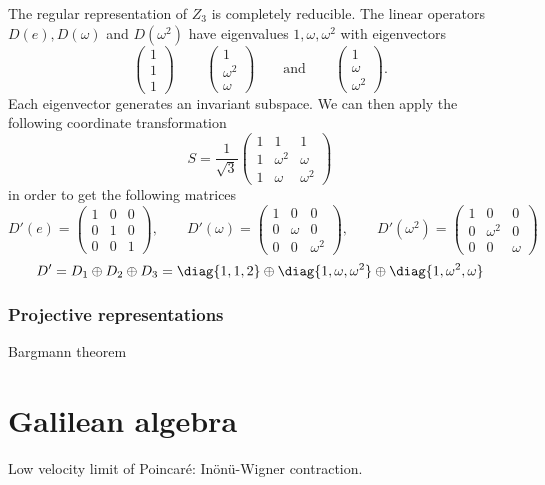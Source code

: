 \begin{example}
The regular representation of $Z_3$ is completely reducible. The linear operators $D(e), D(\omega)$ and $D(\omega^2)$ have eigenvalues $1,\omega, \omega^2$ with eigenvectors 
\[ \begin{pmatrix}
1\\1\\1
\end{pmatrix}\, \qquad \begin{pmatrix}
1\\ \omega^2 \\ \omega
\end{pmatrix} \qquad \text{and} \qquad \begin{pmatrix}
1 \\ \omega \\ \omega^2
\end{pmatrix}. \]
Each eigenvector generates an invariant subspace. We can then apply the following coordinate transformation
\[ S = \frac{1}{\sqrt{3}}\begin{pmatrix}
1&1&1\\
1&\omega^2 & \omega \\
1&\omega& \omega^2
\end{pmatrix} \]
in order to get the following matrices
\[D'(e) = \begin{pmatrix}
1&0&0\\
0&1&0\\
0&0&1
\end{pmatrix}, \qquad D'(\omega) = \begin{pmatrix}
1 & 0 & 0\\
0& \omega & 0 \\
0&0&\omega^2
\end{pmatrix}, \qquad D'(\omega^2) = \begin{pmatrix}
1 & 0 & 0\\
0& \omega^2 & 0 \\
0&0&\omega
\end{pmatrix}\]
\[ D' = D_1\oplus D_2 \oplus D_3 = \diag\{1,1,2\}\oplus \diag\{1,\omega, \omega^2\} \oplus \diag\{1, \omega^2, \omega\} \]
\end{example}

\subsubsection{Projective representations}
Bargmann theorem



\section{Galilean algebra}
Low velocity limit of Poincaré: Inönü-Wigner contraction.

